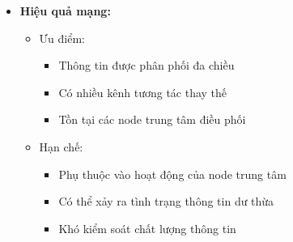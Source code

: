 \documentclass[12pt,a4paper]{article}
\begin{document}
\begin{itemize}
\item \textbf{Hiệu quả mạng:}
    \begin{itemize}
    \item Ưu điểm:
        \begin{itemize}
        \item Thông tin được phân phối đa chiều
        \item Có nhiều kênh tương tác thay thế
        \item Tồn tại các node trung tâm điều phối
        \end{itemize}
    \item Hạn chế:
        \begin{itemize}
        \item Phụ thuộc vào hoạt động của node trung tâm
        \item Có thể xảy ra tình trạng thông tin dư thừa
        \item Khó kiểm soát chất lượng thông tin
        \end{itemize}
    \end{itemize}
\end{itemize}
\end{document}
